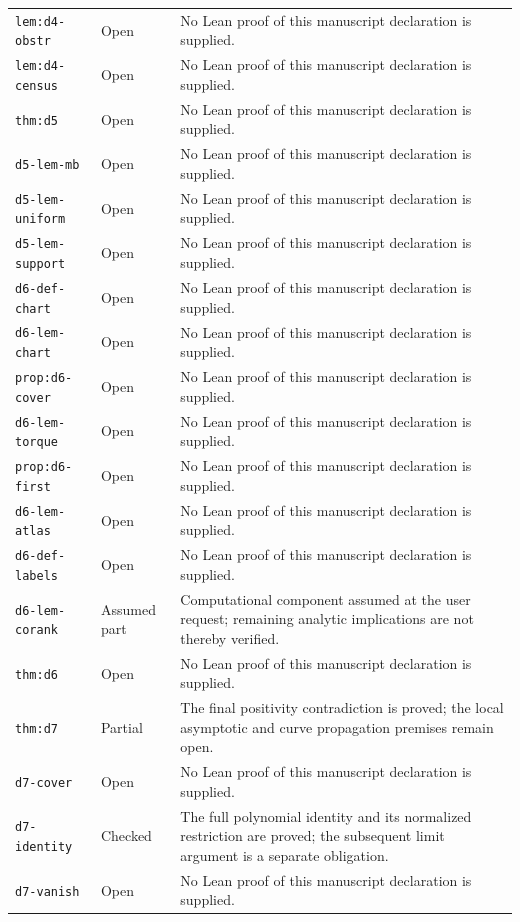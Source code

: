 \documentclass[Threeside,11pt]{article}
\theoremstyle{definition}
\theoremstyle{remark}
\numberwithin{equation}{section}
\theoremstyle{remark}
\newcommand{\code}[1]{\begingroup\def\_{\textunderscore\allowbreak}\texttt{#1}\endgroup}
\begin{document}
\begin{longtable}{p{4.0cm}p{1.8cm}p{8.9cm}}
\code{lem:d4-obstr} & Open & No Lean proof of this manuscript declaration is supplied. \\
\code{lem:d4-census} & Open & No Lean proof of this manuscript declaration is supplied. \\
\code{thm:d5} & Open & No Lean proof of this manuscript declaration is supplied. \\
\code{d5-lem-mb} & Open & No Lean proof of this manuscript declaration is supplied. \\
\code{d5-lem-uniform} & Open & No Lean proof of this manuscript declaration is supplied. \\
\code{d5-lem-support} & Open & No Lean proof of this manuscript declaration is supplied. \\
\code{d6-def-chart} & Open & No Lean proof of this manuscript declaration is supplied. \\
\code{d6-lem-chart} & Open & No Lean proof of this manuscript declaration is supplied. \\
\code{prop:d6-cover} & Open & No Lean proof of this manuscript declaration is supplied. \\
\code{d6-lem-torque} & Open & No Lean proof of this manuscript declaration is supplied. \\
\code{prop:d6-first} & Open & No Lean proof of this manuscript declaration is supplied. \\
\code{d6-lem-atlas} & Open & No Lean proof of this manuscript declaration is supplied. \\
\code{d6-def-labels} & Open & No Lean proof of this manuscript declaration is supplied. \\
\code{d6-lem-corank} & Assumed part & Computational component assumed at the user request; remaining analytic implications are not thereby verified. \\
\code{thm:d6} & Open & No Lean proof of this manuscript declaration is supplied. \\
\code{thm:d7} & Partial & The final positivity contradiction is proved; the local asymptotic and curve propagation premises remain open. \\
\code{d7-cover} & Open & No Lean proof of this manuscript declaration is supplied. \\
\code{d7-identity} & Checked & The full polynomial identity and its normalized restriction are proved; the subsequent limit argument is a separate obligation. \\
\code{d7-vanish} & Open & No Lean proof of this manuscript declaration is supplied. \\

\end{longtable}
\end{document}
